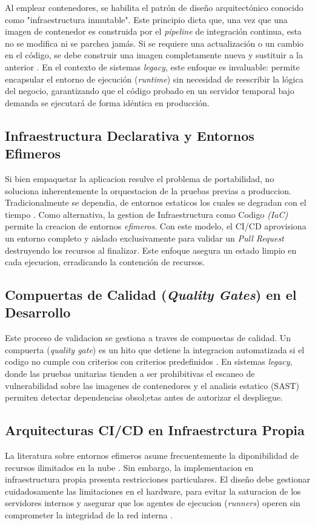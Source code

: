 Al emplear contenedores, se habilita el patrón de diseño arquitectónico conocido como 
"infraestructura inmutable". Este principio dicta que, una vez que una imagen de contenedor es 
construida por el \emph{pipeline} de integración continua, esta no se modifica ni se parchea jamás. 
Si se requiere una actualización o un cambio en el código, se debe construir una imagen completamente 
nueva y sustituir a la anterior \cite{Taibi2022}. En el contexto de sistemas \emph{legacy}, este 
enfoque es invaluable: permite encapsular el entorno de ejecución (\emph{runtime}) sin necesidad 
de reescribir la lógica del negocio, garantizando que el código probado en un servidor temporal 
bajo demanda se ejecutará de forma idéntica en producción.

\subsection{Infraestructura Declarativa y Entornos Efimeros}
Si bien empaquetar la aplicacion resulve el problema de portabilidad, no soluciona inherentemente
la orquestacion de la pruebas previas a produccion. Tradicionalmente se dependia, de entornos estaticos
los cuales se degradan con el tiempo \cite{Proulx2018}. Como alternativa, la gestion de Infraestructura como Codigo
\emph{(IaC)} permite la creacion de entornos \emph{efimeros}. Con este modelo, el CI/CD aprovisiona un
entorno completo y aislado exclusivamente para validar un \emph{Pull Request} destruyendo los recursos 
al finalizar. Este enfoque asegura un estado limpio en cada ejecucion, erradicando la contención de recursos.

\subsection{Compuertas de Calidad (\emph{Quality Gates}) en el Desarrollo}
Este proceso de validacion se gestiona a traves de compuestas de calidad. Un compuerta
(\emph{quality gate}) es un hito que detiene la integracion automatizada si el codigo no cumple
con criterios con criterios predefinidos \cite{Rajesh2023}. En sistemas \emph{legacy}, donde
las pruebas unitarias tienden a ser prohibitivas el escaneo de vulnerabilidad sobre las imagenes de contenedores
y el analisis estatico (SAST) permiten detectar dependencias obsol;etas antes de autorizar el 
despliegue.

\subsection{Arquitecturas CI/CD en Infraestrctura Propia}
La literatura sobre entornos efimeros asume frecuentemente la diponibilidad de recursos ilimitados en la
nube \cite{Kosinska2020}. Sin embargo, la implementacion en infraestructura propia presenta restricciones particulares.
El diseño debe gestionar cuidadosamente las limitaciones en el hardware, para evitar la saturacion de 
los servidores internos y asegurar que los agentes de ejecucion (\emph{runners}) operen sin comprometer
la integridad de la red interna \cite{Rajesh2023}.

